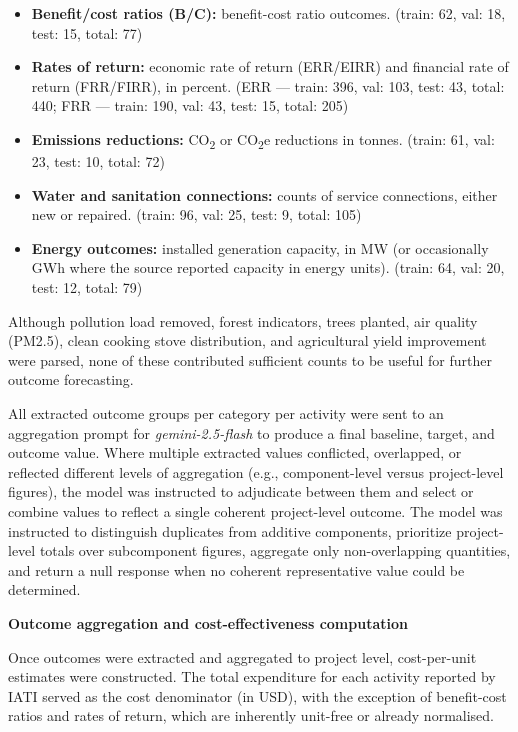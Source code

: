 \begin{itemize}[noitemsep,topsep=0pt]
\item \textbf{Benefit/cost ratios (B/C):} benefit-cost ratio outcomes. (train: 62, val: 18, test: 15, total: 77)
\item \textbf{Rates of return:} economic rate of return (ERR/EIRR) and financial rate of return (FRR/FIRR), in percent. (ERR — train: 396, val: 103, test: 43, total: 440; FRR — train: 190,  val: 43, test: 15, total: 205)
\item \textbf{Emissions reductions:} CO\textsubscript{2} or CO\textsubscript{2}e reductions in tonnes. (train: 61, val: 23, test: 10, total: 72)
\item \textbf{Water and sanitation connections:} counts of service connections, either new or repaired. (train: 96, val: 25, test: 9, total: 105)
\item \textbf{Energy outcomes:} installed generation capacity, in MW (or occasionally GWh where the source reported capacity in energy units). (train: 64, val: 20, test: 12, total: 79)

\end{itemize}
Although pollution load removed, forest indicators, trees planted, air quality (PM2.5), clean cooking stove distribution, and agricultural yield improvement were parsed, none of these contributed sufficient counts to be useful for further outcome forecasting.

All extracted outcome groups per category per activity were sent to an aggregation prompt for \emph{gemini-2.5-flash} to produce a final baseline, target, and outcome value. Where multiple extracted values conflicted, overlapped, or reflected different levels of aggregation (e.g., component-level versus project-level figures), the model was instructed to adjudicate between them and select or combine values to reflect a single coherent project-level outcome. The model was instructed to distinguish duplicates from additive components, prioritize project-level totals over subcomponent figures, aggregate only non-overlapping quantities, and return a null response when no coherent representative value could be determined.

\textbf{Outcome aggregation and cost-effectiveness computation}

Once outcomes were extracted and aggregated to project level, cost-per-unit estimates were constructed. The total expenditure for each activity reported by IATI served as the cost denominator (in USD), with the exception of benefit-cost ratios and rates of return, which are inherently unit-free or already normalised.

